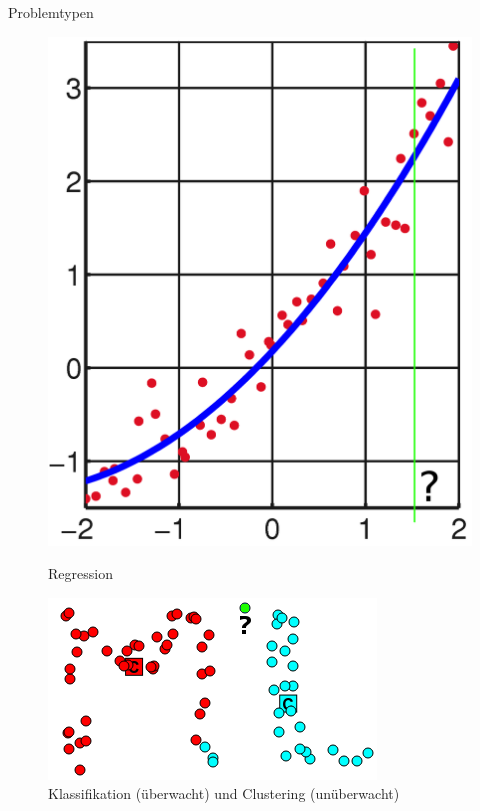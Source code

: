 \begin{frame}{Problemtypen}
    \begin{figure}[ht]
        \begin{minipage}[b]{0.45\linewidth}
            \centering
            \includegraphics[width=\textwidth]{../images/regression-linear-least-squares-2.png}
            \caption{Regression}
            \label{fig:Regression}
        \end{minipage}
        \hspace{0.5cm}
        \begin{minipage}[b]{0.45\linewidth}
            \centering
            \includegraphics[width=\textwidth]{../images/clustering.png}
            \caption{Klassifikation (überwacht) und Clustering (unüberwacht)}
            \label{fig:Klassifikation}
        \end{minipage}
    \end{figure}
\end{frame}


